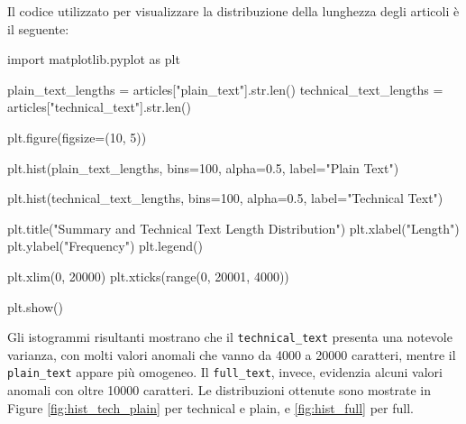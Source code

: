 \documentclass[12pt,a4paper,twoside,openright]{book}
\begin{document}
Il codice utilizzato per visualizzare la distribuzione della lunghezza degli articoli è il seguente:

\begin{python}[caption={Python script per visualizzare le distribuzioni di frequenza delle lunghezze degli articoli.}, label={lst:py-plt-hist}]
import matplotlib.pyplot as plt

plain_text_lengths = articles["plain_text"].str.len()
technical_text_lengths = articles["technical_text"].str.len()

plt.figure(figsize=(10, 5))

plt.hist(plain_text_lengths, bins=100, alpha=0.5, label="Plain Text")

plt.hist(technical_text_lengths, bins=100, alpha=0.5, label="Technical Text")

plt.title("Summary and Technical Text Length Distribution")
plt.xlabel("Length")
plt.ylabel("Frequency")
plt.legend()

plt.xlim(0, 20000) 
plt.xticks(range(0, 20001, 4000)) 

plt.show()
\end{python}
Gli istogrammi risultanti mostrano che il \texttt{technical\_text} presenta una notevole varianza, con molti valori anomali che vanno da 4000 a 20000 caratteri, mentre il \texttt{plain\_text} appare più omogeneo. Il \texttt{full\_text}, invece, evidenzia alcuni valori anomali con oltre 10000 caratteri.
Le distribuzioni ottenute sono mostrate in Figure \ref{fig:hist_tech_plain} per technical e plain, e \ref{fig:hist_full} per full.
\end{document}

